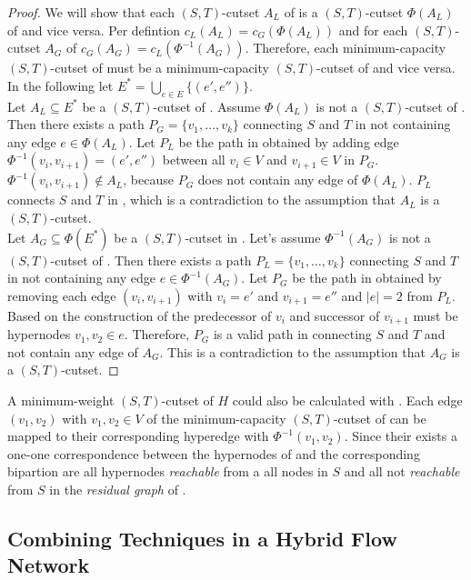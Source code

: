 \begin{proof}
We will show that each $(S,T)$-cutset $A_L$ of  is a $(S,T)$-cutset $\Phi(A_L)$ of
 and vice versa. Per defintion $c_L(A_L) = c_G(\Phi(A_L))$ and for each $(S,T)$-cutset
$A_G$ of  $c_G(A_G) = c_L(\Phi^{-1}(A_G))$. Therefore, each minimum-capacity $(S,T)$-cutset
of  must be a minimum-capacity $(S,T)$-cutset of  and vice versa. In the following 
let $E^* = \bigcup_{e \in E} \{(e',e'')\}$. \\
Let $A_L \subseteq E^*$ be a $(S,T)$-cutset of . Assume $\Phi(A_L)$ is not a $(S,T)$-cutset
of . Then there exists a path
$P_G = \{v_1,\ldots,v_k\}$ connecting $S$ and $T$ in  not containing any edge $e \in \Phi(A_L)$.
Let $P_L$ be the path in  obtained by adding edge $\Phi^{-1}(v_i,v_{i+1}) = (e',e'')$ between all
$v_i \in V$ and $v_{i+1} \in V$ in $P_G$. $\Phi^{-1}(v_i,v_{i+1}) \notin A_L$, because
$P_G$ does not contain any edge of $\Phi(A_L)$. $P_L$ connects $S$ and
$T$ in , which is a contradiction to the assumption that $A_L$ is a $(S,T)$-cutset. \\
Let $A_G \subseteq \Phi(E^*)$ be a $(S,T)$-cutset in . Let's assume $\Phi^{-1}(A_G)$ is not
a $(S,T)$-cutset of . Then there exists a path $P_L = \{v_1,\ldots,v_k\}$ 
connecting $S$ and $T$ in  not containing any
edge $e \in \Phi^{-1}(A_G)$. Let $P_G$ be the path in  obtained by removing each edge
$(v_i,v_{i+1})$ with $v_i = e'$ and $v_{i+1} = e''$ and $|e| = 2$ from $P_L$. Based on the construction
of  the predecessor of $v_i$ and successor of $v_{i+1}$ must be hypernodes $v_1,v_2 \in e$.
Therefore, $P_G$ is a valid path in  connecting $S$ and $T$ and not contain any edge of 
$A_G$. This is a contradiction to the assumption that $A_G$ is a $(S,T)$-cutset.
\end{proof} 

A minimum-weight $(S,T)$-cutset of $H$ could also be calculated with . 
Each edge $(v_1,v_2)$ with $v_1,v_2 \in V$ of the minimum-capacity
$(S,T)$-cutset of  can be mapped to their corresponding hyperedge
with $\Phi^{-1}(v_1,v_2)$. Since their exists a one-one correspondence between the hypernodes
of  and  the corresponding bipartion are all hypernodes \emph{reachable}
from a all nodes in $S$ and all not \emph{reachable} from $S$ in the \emph{residual graph}
of . 

\subsection{Combining Techniques in a Hybrid Flow Network}
\label{sec:hybrid_network}


